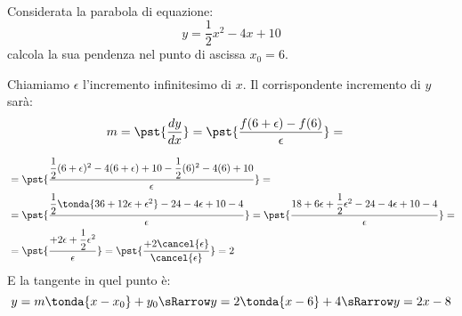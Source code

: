 \begin{esempio}
{~}

\begin{minipage}{.49\textwidth}
Considerata la parabola di equazione:
\[y=\dfrac{1}{2}x^2-4x+10\] 
calcola la sua pendenza nel punto di ascissa \(x_0=6\).

Chiamiamo \(\epsilon\) l'incremento infinitesimo di \(x\).
Il corrispondente incremento di \(y\) sarà: 
\begin{align*}
m&=\pst{\dfrac{d y}{d x}}=
\pst{\dfrac{f(6+\epsilon)-f(6)}{\epsilon}}=
\end{align*}
\end{minipage}
\hfill
\begin{minipage}{.49\textwidth}
\begin{center}\ipertangentea\end{center}
\end{minipage}
\begin{align*}
&=\pst{\dfrac{\dfrac{1}{2}(6+\epsilon)^2-4(6+\epsilon)+10
              -\dfrac{1}{2}(6)^2-4(6)+10}
             {\epsilon}}=\\
&=\pst{\dfrac{\dfrac{1}{2}\tonda{36+12\epsilon+\epsilon^2}-24-4\epsilon+10
              -4}
             {\epsilon}}=
   \pst{\dfrac{18+6\epsilon+\dfrac{1}{2}\epsilon^2-24-4\epsilon+10-4}
             {\epsilon}}=\\
 &=\pst{\dfrac{+2\epsilon+\dfrac{1}{2}\epsilon^2}{\epsilon}}=
   \pst{\dfrac{+2\cancel{\epsilon}}{\cancel{\epsilon}}}=2
\end{align*}
E la tangente in quel punto è:
\[y=m \tonda{x-x_0}+y_0 \sRarrow y=2 \tonda{x-6}+4 \sRarrow y=2x-8\]
\end{esempio}


